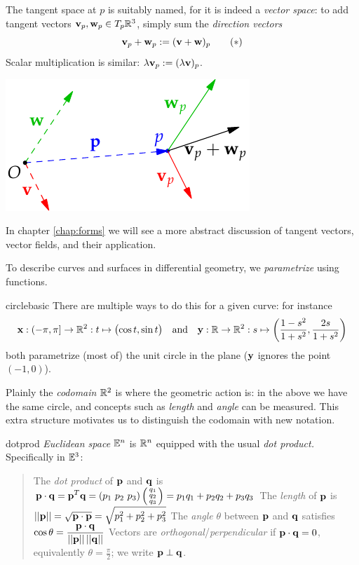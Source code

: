 \begin{minipage}[t]{0.6\linewidth}\vspace{0pt}
	The tangent space at $p$ is suitably named, for it is indeed a \emph{vector space}: to add tangent vectors ${\mathbf{v}}_p,{\mathbf{w}}_p\in T_p\mathbb{R}^3$, simply sum the \emph{direction vectors}
	\[
		{\mathbf{v}}_p+{\mathbf{w}}_p:=({\mathbf{v}}+{\mathbf{w}})_p\tag{$\ast$}
	\]
	Scalar multiplication is similar: $\lambda{\mathbf{v}}_p:=(\lambda{\mathbf{v}})_p$. 
\end{minipage}
\hfill
\begin{minipage}[t]{0.39\linewidth}\vspace{0pt}
	\flushright\includegraphics{euclid-tanvec2}
\end{minipage}\medbreak

In chapter \ref{chap:forms} we will see a more abstract discussion of tangent vectors, vector fields, and their application.



To describe curves and surfaces in differential geometry, we \emph{parametrize} using functions.

\begin{example}{}{circlebasic}
	There are multiple ways to do this for a given curve: for instance
	\[
		{\mathbf{x}}:(-\pi,\pi]\to \mathbb{R}^2: t\mapsto \bigl(\cos t,\sin t\bigr)\quad \text{and} \quad{\mathbf{y}}:\mathbb{R}\to\mathbb{R}^2:s\mapsto \left(\frac{1-s^2}{1+s^2},\frac{2s}{1+s^2}\right)
	\]
	both parametrize (most of) the unit circle in the plane (${\mathbf{y}}$ ignores the point $(-1,0)$).
\end{example}

Plainly the \emph{codomain} $\mathbb{R}^2$ is where the geometric action is: in the above we have the same circle, and concepts such as \emph{length} and \emph{angle} can be measured. This extra structure motivates us to distinguish the codomain with new notation.

\begin{defn}{}{dotprod}
	\emph{Euclidean space} $\mathbb{E}^n$ is $\mathbb{R}^n$ equipped with the usual \emph{dot product.} Specifically in $\mathbb{E}^3$:
	\begin{quote}
		The \emph{dot product} of ${\mathbf{p}}$ and ${\mathbf{q}}$ is $\displaystyle\vp\cdot\vq=\vp^T\vq=(p_1\ p_2\ p_3)\sthreevec{q_1}{q_2}{q_3}=p_1q_1+p_2q_2+p_3q_3$\smallbreak
		The \emph{length} of ${\mathbf{p}}$ is $\displaystyle\left| \left| {\mathbf{p}}\right|\right|=\sqrt{{\mathbf{p}}\cdot{\mathbf{p}}}=\sqrt{p_1^2+p_2^2+p_3^2}$\smallbreak
		The \emph{angle} $\theta$ between ${\mathbf{p}}$ and ${\mathbf{q}}$ satisfies $\displaystyle\cos\theta=\smash[t]{\frac{{\mathbf{p}}\cdot{\mathbf{q}}}{\left| \left| {\mathbf{p}}\right|\right|\left| \left| {\mathbf{q}}\right|\right|}}$\smallbreak
		Vectors are \emph{orthogonal}/\emph{perpendicular} if ${\mathbf{p}}\cdot{\mathbf{q}}=0$, equivalently $\theta=\frac\pi 2$; we write ${\mathbf{p}}\perp{\mathbf{q}}$.
	\end{quote}
\end{defn}


